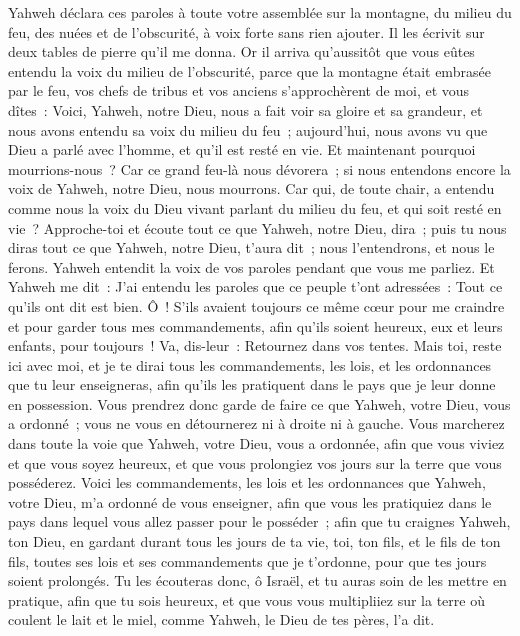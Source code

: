 \begin{multicols}{2}
Yahweh déclara ces paroles à toute votre assemblée sur la montagne, du milieu du feu, des nuées et de l'obscurité, à voix forte sans rien ajouter. Il les écrivit sur deux tables de pierre qu'il me donna.
Or il arriva qu'aussitôt que vous eûtes entendu la voix du milieu de l'obscurité, parce que la montagne était embrasée par le feu, vos chefs de tribus et vos anciens s'approchèrent de moi,
et vous dîtes~: Voici, Yahweh, notre Dieu, nous a fait voir sa gloire et sa grandeur, et nous avons entendu sa voix du milieu du feu~; aujourd'hui, nous avons vu que Dieu a parlé avec l'homme, et qu'il est resté en vie.
Et maintenant pourquoi mourrions-nous~? Car ce grand feu-là nous dévorera~; si nous entendons encore la voix de Yahweh, notre Dieu, nous mourrons.
Car qui, de toute chair, a entendu comme nous la voix du Dieu vivant parlant du milieu du feu, et qui soit resté en vie~?
Approche-toi et écoute tout ce que Yahweh, notre Dieu, dira~; puis tu nous diras tout ce que Yahweh, notre Dieu, t'aura dit~; nous l'entendrons, et nous le ferons.
Yahweh entendit la voix de vos paroles pendant que vous me parliez. Et Yahweh me dit~: J'ai entendu les paroles que ce peuple t'ont adressées~: Tout ce qu'ils ont dit est bien.
Ô~! S'ils avaient toujours ce même cœur pour me craindre et pour garder tous mes commandements, afin qu'ils soient heureux, eux et leurs enfants, pour toujours~!
Va, dis-leur~: Retournez dans vos tentes.
Mais toi, reste ici avec moi, et je te dirai tous les commandements, les lois, et les ordonnances que tu leur enseigneras, afin qu'ils les pratiquent dans le pays que je leur donne en possession.
Vous prendrez donc garde de faire ce que Yahweh, votre Dieu, vous a ordonné~; vous ne vous en détournerez ni à droite ni à gauche.
Vous marcherez dans toute la voie que Yahweh, votre Dieu, vous a ordonnée, afin que vous viviez et que vous soyez heureux, et que vous prolongiez vos jours sur la terre que vous posséderez.
\VerseOne{}Voici les commandements, les lois et les ordonnances que Yahweh, votre Dieu, m'a ordonné de vous enseigner, afin que vous les pratiquiez dans le pays dans lequel vous allez passer pour le posséder~;
afin que tu craignes Yahweh, ton Dieu, en gardant durant tous les jours de ta vie, toi, ton fils, et le fils de ton fils, toutes ses lois et ses commandements que je t'ordonne, pour que tes jours soient prolongés.
Tu les écouteras donc, ô Israël, et tu auras soin de les mettre en pratique, afin que tu sois heureux, et que vous vous multipliiez sur la terre où coulent le lait et le miel, comme Yahweh, le Dieu de tes pères, l'a dit.

\end{multicols}
